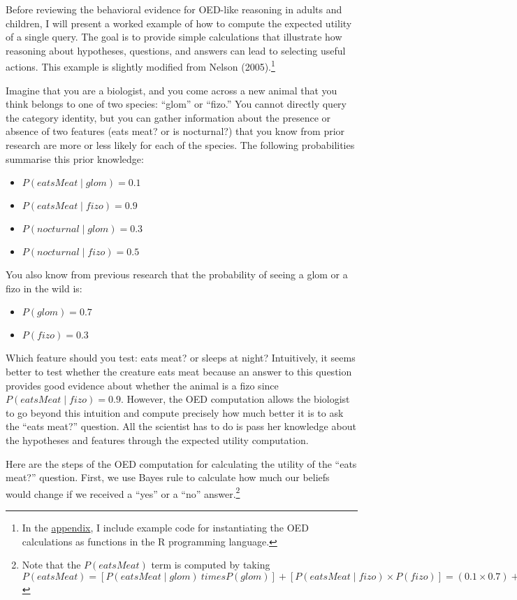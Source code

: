 \documentclass[oneside]{report}
\begin{document}
Before reviewing the behavioral evidence for OED-like reasoning in
adults and children, I will present a worked example of how to compute
the expected utility of a single query. The goal is to provide simple
calculations that illustrate how reasoning about hypotheses, questions,
and answers can lead to selecting useful actions. This example is
slightly modified from Nelson (2005).\footnote{In the
  \protect\hyperlink{app}{appendix}, I include example code for
  instantiating the OED calculations as functions in the R programming
  language.}

Imagine that you are a biologist, and you come across a new animal that
you think belongs to one of two species: ``glom'' or ``fizo.'' You
cannot directly query the category identity, but you can gather
information about the presence or absence of two features (eats meat? or
is nocturnal?) that you know from prior research are more or less likely
for each of the species. The following probabilities summarise this
prior knowledge:
\begin{itemize}
\tightlist
\item
  \(P(eatsMeat \mid glom) = 0.1\)\\
\item
  \(P(eatsMeat \mid fizo) = 0.9\)
\item
  \(P(nocturnal \mid glom) = 0.3\)\\
\item
  \(P(nocturnal \mid fizo) = 0.5\)
\end{itemize}
\noindent   You also know from previous research that the probability of
seeing a glom or a fizo in the wild is:
\begin{itemize}
\tightlist
\item
  \(P(glom) = 0.7\)
\item
  \(P(fizo) = 0.3\)
\end{itemize}
\noindent   Which feature should you test: eats meat? or sleeps at
night? Intuitively, it seems better to test whether the creature eats
meat because an answer to this question provides good evidence about
whether the animal is a fizo since \(P(eatsMeat \mid fizo) = 0.9\).
However, the OED computation allows the biologist to go beyond this
intuition and compute precisely how much better it is to ask the ``eats
meat?'' question. All the scientist has to do is pass her knowledge
about the hypotheses and features through the expected utility
computation.

Here are the steps of the OED computation for calculating the utility of
the ``eats meat?'' question. First, we use Bayes rule to calculate how
much our beliefs would change if we received a ``yes'' or a ``no''
answer.\footnote{Note that the \(P(eatsMeat)\) term is computed by
  taking
  \(P(eatsMeat) = [P(eatsMeat \mid glom) \ times P(glom)] + [P(eatsMeat \mid fizo) \times P(fizo)] = (0.1 \times 0.7) + (0.9 \times 0.3) = 0.34\)}
\end{document}
